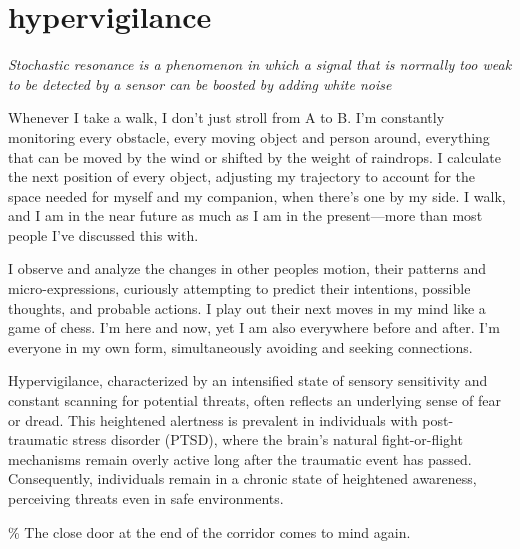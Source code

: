 \chapter*{hypervigilance}
\begin{center}
\vspace{2cm}
\begin{flushright}
\large
\textit{Stochastic resonance is a phenomenon in which a signal that is normally too weak to be detected by a sensor can be boosted by adding white noise}
\end{flushright}
\vspace{2cm}
\end{center}
\normalsize

\newpage  %
Whenever I take a walk, I don't just stroll from A to B. I'm constantly monitoring every obstacle, every moving object and person around, everything that can be moved by the wind or shifted by the weight of raindrops. I calculate the next position of every object, adjusting my trajectory to account for the space needed for myself and my companion, when there's one by my side. I walk, and I am in the near future as much as I am in the present—more than most people I've discussed this with.

I observe and analyze the changes in other peoples motion, their patterns and micro-expressions, curiously attempting to predict their intentions, possible thoughts, and probable actions. I play out their next moves in my mind like a game of chess. I'm here and now, yet I am also everywhere before and after. I'm everyone in my own form, simultaneously avoiding and seeking connections.

Hypervigilance, characterized by an intensified state of sensory sensitivity and constant scanning for potential threats, often reflects an underlying sense of fear or dread. This heightened alertness is prevalent in individuals with post-traumatic stress disorder (PTSD), where the brain's natural fight-or-flight mechanisms remain overly active long after the traumatic event has passed. Consequently, individuals remain in a chronic state of heightened awareness, perceiving threats even in safe environments.  

{\scriptsize \textcolor{comment}{\% The close door at the end of the corridor comes to mind again. }}

